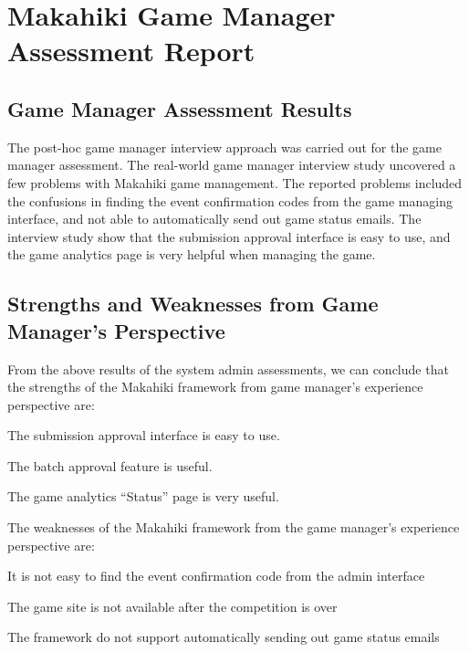 \section{Makahiki Game Manager Assessment Report}

\subsection{Game Manager Assessment Results}

The post-hoc game manager interview approach was carried out for the game manager assessment. The real-world game manager interview study uncovered a few problems with Makahiki game management. The reported problems included the confusions in finding the event confirmation codes from the game managing interface, and not able to automatically send out game status emails.  The interview study show that the submission approval interface is easy to use, and the game analytics page is very helpful when managing the game.

\subsection{Strengths and Weaknesses from Game Manager's Perspective}
   
From the above results of the system admin assessments, we can conclude that the strengths of the Makahiki framework from game manager's experience perspective are: 

    \begin{compactenum}
    \item The submission approval interface is easy to use.
    \item The batch approval feature is useful.
    \item The game analytics ``Status'' page is very useful.
    \end{compactenum} 
    
The weaknesses of the Makahiki framework from the game manager's experience perspective are:

    \begin{compactenum}
    \item It is not easy to find the event confirmation code from the admin interface
    \item The game site is not available after the competition is over
    \item The framework do not support automatically sending out game status emails 
    \end{compactenum} 

